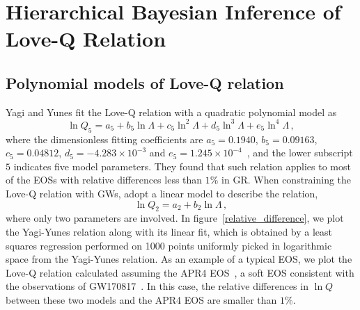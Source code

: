 \documentclass[a4paper,11pt]{article}
\begin{document}
\section{Hierarchical Bayesian Inference of Love-Q Relation}
\label{sec:framework}

\subsection{Polynomial models of Love-Q relation} 
\label{subsec:framework_parameterization}
Yagi and Yunes fit the Love-Q relation with a quadratic polynomial model as~\cite{Yagi:2013bca,Yagi:2013awa,Yagi_2017}
\begin{equation}
\label{5-d_Love_Q_eq}
    \ln Q_{5}=a_5 + b_5 \ln \Lambda + c_5 \ln^2\Lambda + d_5 \ln^3\Lambda + e_5 \ln^4 \Lambda\,,
\end{equation}
where the dimensionless fitting coefficients are 
$a_5=0.1940$, $b_5=0.09163$, $c_5=0.04812$, 
$d_5=-4.283\times 10^{-3}$ and $e_5=1.245\times 10^{-4}$~\cite{Yagi_2017}, and 
the lower subscript $5$ indicates five model parameters.
They found that such relation applies to most of the EOSs with 
relative differences less than $1\%$ in GR. When constraining the Love-Q
relation with GWs, \citet{Samajdar:2020xrd} adopt a linear model to describe the relation,
\begin{equation}
\label{2-d_Love_Q_eq}
    \ln Q_{2} = a_2 + b_2 \ln \Lambda\,,
\end{equation}
where only two parameters are involved. 
In figure~\ref{relative_difference}, we plot the Yagi-Yunes relation along with 
its linear fit, which is obtained by a least squares regression performed on 1000
points uniformly picked
 in logarithmic space from the Yagi-Yunes relation. 
As an example of a typical EOS, we plot the Love-Q relation calculated assuming the APR4 
EOS~\cite{PhysRevC.58.1804}, a soft EOS consistent with the 
observations of GW170817~\cite{LIGOScientific:2017vwq,LIGOScientific:2018cki,
LIGOScientific:2018hze}. In this case, the relative differences in $\ln Q$ between 
these two models and the APR4 EOS are smaller than $1\%$. 
\end{document}
